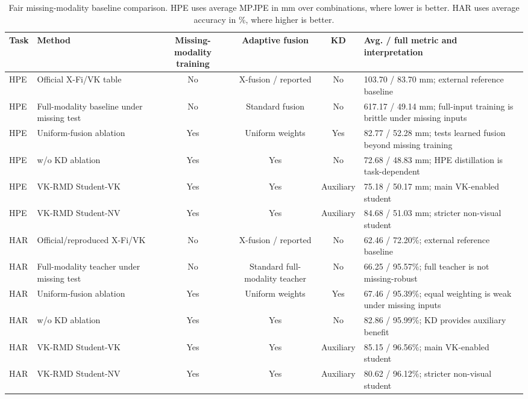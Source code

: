 \documentclass[preprint,12pt]{elsarticle}
\newcommand{\method}{VK-RMD}
\newcommand{\mpjpe}{MPJPE}
\begin{document}
\begin{table}[t]
\centering
\caption{Fair missing-modality baseline comparison. HPE uses average \mpjpe{} in mm over combinations, where lower is better. HAR uses average accuracy in \%, where higher is better.}
\label{tab:fair_baseline}
\scriptsize
\begin{adjustbox}{width=\textwidth}
\begin{tabular}{llcccl}
\toprule
Task & Method & Missing-modality training & Adaptive fusion & KD & Avg. / full metric and interpretation \\
\midrule
HPE & Official X-Fi/VK table & No & X-fusion / reported & No & 103.70 / 83.70 mm; external reference baseline \\
HPE & Full-modality baseline under missing test & No & Standard fusion & No & 617.17 / 49.14 mm; full-input training is brittle under missing inputs \\
HPE & Uniform-fusion ablation & Yes & Uniform weights & Yes & 82.77 / 52.28 mm; tests learned fusion beyond missing training \\
HPE & w/o KD ablation & Yes & Yes & No & 72.68 / 48.83 mm; HPE distillation is task-dependent \\
HPE & \method{} Student-VK & Yes & Yes & Auxiliary & 75.18 / 50.17 mm; main VK-enabled student \\
HPE & \method{} Student-NV & Yes & Yes & Auxiliary & 84.68 / 51.03 mm; stricter non-visual student \\
\midrule
HAR & Official/reproduced X-Fi/VK & No & X-fusion / reported & No & 62.46 / 72.20\%; external reference baseline \\
HAR & Full-modality teacher under missing test & No & Standard full-modality teacher & No & 66.25 / 95.57\%; full teacher is not missing-robust \\
HAR & Uniform-fusion ablation & Yes & Uniform weights & Yes & 67.46 / 95.39\%; equal weighting is weak under missing inputs \\
HAR & w/o KD ablation & Yes & Yes & No & 82.86 / 95.99\%; KD provides auxiliary benefit \\
HAR & \method{} Student-VK & Yes & Yes & Auxiliary & 85.15 / 96.56\%; main VK-enabled student \\
HAR & \method{} Student-NV & Yes & Yes & Auxiliary & 80.62 / 96.12\%; stricter non-visual student \\
\bottomrule
\end{tabular}
\end{adjustbox}
\end{table}
\end{document}

